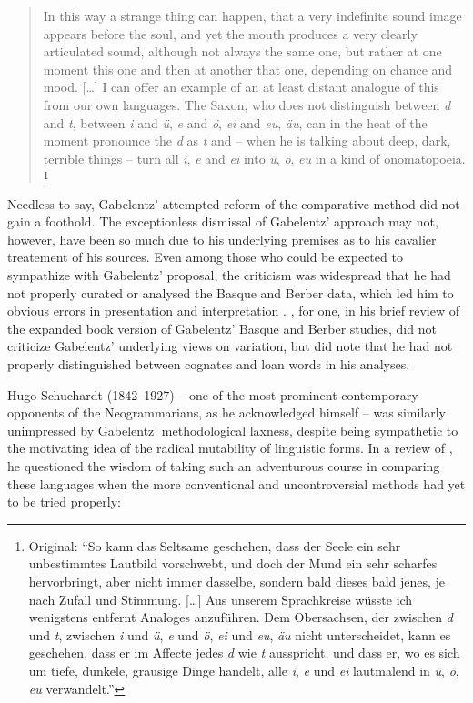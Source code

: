 \documentclass[output=paper]{langscibook}
\begin{document}
\begin{quotation}
In this way a strange thing can happen, that a very indefinite sound image appears before the soul, and yet the mouth produces a very clearly articulated sound, although not always the same one, but rather at one moment this one and then at another that one, depending on chance and mood. […] I can offer an example of an at least distant analogue of this from our own languages. The Saxon, who does not distinguish between \emph{d} and \emph{t}, between \emph{i} and \emph{ü}, \emph{e} and \emph{ö}, \emph{ei} and \emph{eu}, \emph{äu}, can in the heat of the moment pronounce the \emph{d} as \emph{t} and -- when he is talking about deep, dark, terrible things -- turn all \emph{i}, \emph{e} and \emph{ei} into \emph{ü}, \emph{ö}, \emph{eu} in a kind of onomatopoeia. \citep[606--607]{Gabelentz1893}\footnote{Original: ``So kann das Seltsame geschehen, dass der Seele ein sehr unbestimmtes Lautbild vorschwebt, und doch der Mund ein sehr scharfes hervorbringt, aber nicht immer dasselbe, sondern bald dieses bald jenes, je nach Zufall und Stimmung. […] Aus unserem Sprachkreise wüsste ich wenigstens entfernt Analoges anzuführen. Dem Obersachsen, der zwischen \emph{d} und \emph{t}, zwischen \emph{i} und \emph{ü}, \emph{e} und \emph{ö}, \emph{ei} und \emph{eu}, \emph{äu} nicht unterscheidet, kann es geschehen, dass er im Affecte jedes \emph{d} wie \emph{t} ausspricht, und dass er, wo es sich um tiefe, dunkele, grausige Dinge handelt, alle \emph{i}, \emph{e} und \emph{ei} lautmalend in \emph{ü}, \emph{ö}, \emph{eu} verwandelt.''}
\end{quotation}

Needless to say, Gabelentz' attempted reform of the comparative method did not gain a foothold. The exceptionless dismissal of Gabelentz' approach may not, however, have been so much due to his underlying premises as to his cavalier treatement of his sources. Even among those who could be expected to sympathize with Gabelentz' proposal, the criticism was widespread that he had not properly curated or analysed the Basque and Berber data, which led him to obvious errors in presentation and interpretation \citep[cf.][]{HurchPurgay2019}. \citet{Brinton1894}, for one, in his brief review of the \citeyear{Gabelentz1894bb} expanded book version of Gabelentz' Basque and Berber studies, did not criticize Gabelentz' underlying views on variation, but did note that he had not properly distinguished between cognates and loan words in his analyses.

Hugo Schuchardt (1842--1927) -- one of the most prominent contemporary opponents of the Neogrammarians, as he acknowledged himself \citep[see, e.g., ][]{Schuchardt1928} -- was similarly unimpressed by Gabelentz' methodological laxness, despite being sympathetic to the motivating idea of the radical mutability of linguistic forms. In a review of \citet{Gabelentz1894bb}, he questioned the wisdom of taking such an adventurous course in comparing these languages when the more conventional and uncontroversial methods had yet to be tried properly:
\end{document}
